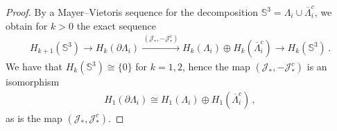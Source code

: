\documentclass[10pt,a4paper]{amsart}
\newcommand{\ST}{\Lambda}
\begin{document}
\begin{proof} 
    By a Mayer–Vietoris sequence for the decomposition \( \mathbb S^3 = \ST_i \cup \overline{\ST}^c_i\), we obtain for \(k>0\) the exact sequence
    \begin{align*}
        H_{k+1} (\mathbb{S}^3) \to H_k (\partial \ST_i) \xrightarrow{ \, (\mathcal{J}_* , - \mathcal{J}^c_* ) \, } H_k (\ST_i) \oplus H_k (\overline{\ST}_i^c) \to H_{k} (\mathbb{S}^3) \, .
    \end{align*}
    We have that \( H_{k} (\mathbb{S}^3) \cong \{0\}\) for \(k=1,2\), hence the map \((\mathcal{J}_* , -\mathcal{J}^c_* )\) is an isomorphism 
    \begin{align}\label{eq:split_boundary}
        H_1 (\partial \ST_i) \cong H_1 (\ST_i) \oplus H_1 (\overline{\ST}_i^c) \, ,
    \end{align}
    as is the map \((\mathcal{J}_* , \mathcal{J}^c_* )\). 
\end{proof}
\end{document}
